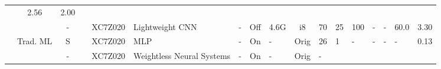 \begin{table}
\begin{adjustbox}{totalheight=\baselineskip,}
\begin{tabular}{ccccclp{2em}cp{3em}cp{2em}p{4em}p{3em}p{3.5em}p{3.5em}p{2.5em}p{3em}}
                                                           &\multirow{1}{*}{2.56}
                                                               &\multirow{1}{*}{2.00}\\
\cmidrule{3-17}
   &   &\multirow{1}{*}{-}
           &\multirow{1}{*}{\cite{wangFastDetectionObstacle2024}}
               &\multirow{1}{*}{XC7Z020}
                   &\multirow{1}{*}{Lightweight CNN}
                       &\multirow{1}{*}{-}
                           &\multirow{1}{*}{Off}
                               &\multirow{1}{*}{4.6G}
                                   &\multirow{1}{*}{i8}
                                       &\multirow{1}{*}{70}
                                           &\multirow{1}{*}{25}
                                               &\multirow{1}{*}{100}
                                                   &\multirow{1}{*}{-}
                                                       &\multirow{1}{*}{-}
                                                           &\multirow{1}{*}{60.0}
                                                               &\multirow{1}{*}{3.30}\\
\cmidrule{2-17}
   &\multirow{2}{*}{Trad. ML}
       &\multirow{1}{*}{S}
           &\multirow{1}{*}{\cite{hammoudArtificialNeuralNetworksBased2022a}}
               &\multirow{1}{*}{XC7Z020}
                   &\multirow{1}{*}{MLP}
                       &\multirow{1}{*}{-}
                           &\multirow{1}{*}{On}
                               &\multirow{1}{*}{-}
                                   &\multirow{1}{*}{Orig}
                                       &\multirow{1}{*}{26}
                                           &\multirow{1}{*}{1}
                                               &\multirow{1}{*}{-}
                                                   &\multirow{1}{*}{-}
                                                       &\multirow{1}{*}{-}
                                                           &\multirow{1}{*}{-}
                                                               &\multirow{1}{*}{0.13}\\
\cmidrule{3-17}
   &   &\multirow{1}{*}{-}
           &\multirow{1}{*}{\cite{torresCombinedWeightlessNeural2020}}
               &\multirow{1}{*}{XC7Z020}
                   &\multirow{1}{*}{Weightless Neural Systems}
                       &\multirow{1}{*}{-}
                           &\multirow{1}{*}{On}
                               &\multirow{1}{*}{-}
                                   &\multirow{1}{*}{Orig}
                                       &\multirow{1}{*}{-}

\end{tabular}
\end{adjustbox}
\end{table}
